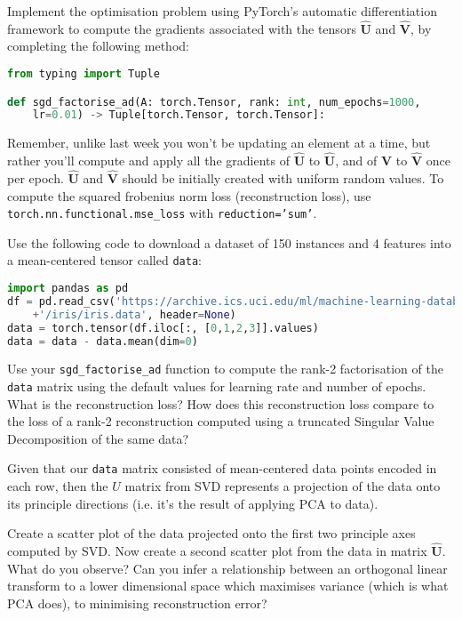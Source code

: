 \documentclass[a4paper]{article}
\begin{document}
\begin{tcolorbox}[title=1.1 Implement gradient-based factorisation using PyTorch's AD (1 mark)]
Implement the optimisation problem using PyTorch's automatic differentiation framework to compute the gradients associated with the tensors $\hat{\bm U}$ and $\hat{\bm V}$, by completing the following method:

\begin{lstlisting}[language=Python]
from typing import Tuple

def sgd_factorise_ad(A: torch.Tensor, rank: int, num_epochs=1000, 
	lr=0.01) -> Tuple[torch.Tensor, torch.Tensor]:
\end{lstlisting}

Remember, unlike last week you won't be updating an element at a time, but rather you'll compute and apply all the gradients of $\hat{\bm U}$ to $\hat{\bm U}$, and of $\hat{\bm V}$ to $\hat{\bm V}$ once per epoch. $\hat{\bm U}$ and $\hat{\bm V}$ should be initially created with uniform random values. To compute the squared frobenius norm loss (reconstruction loss), use \texttt{torch.nn.functional.mse\_loss} with \texttt{reduction='sum'}.
\end{tcolorbox}

\begin{tcolorbox}[title=1.2 Factorise and compute reconstruction error on real data (1 mark)]
Use the following code to download a dataset of 150 instances and 4 features into a mean-centered tensor called \texttt{data}:

\begin{lstlisting}[language=Python]
import pandas as pd
df = pd.read_csv('https://archive.ics.uci.edu/ml/machine-learning-databases'
	+'/iris/iris.data', header=None)
data = torch.tensor(df.iloc[:, [0,1,2,3]].values)
data = data - data.mean(dim=0)
\end{lstlisting}

Use your \texttt{sgd\_factorise\_ad} function to compute the rank-2 factorisation of the \texttt{data} matrix using the default values for learning rate and number of epochs. What is the reconstruction loss? How does this reconstruction loss compare to the loss of a rank-2 reconstruction computed using a truncated Singular Value Decomposition of the same data?
\end{tcolorbox}

\begin{tcolorbox}[title=1.3 Compare against PCA (1 mark)]
Given that our \texttt{data} matrix consisted of mean-centered data points encoded in each row, then the $U$ matrix from SVD represents a projection of the data onto its principle directions (i.e. it's the result of applying PCA to data).

Create a scatter plot of the data projected onto the first two principle axes computed by SVD. Now create a second scatter plot from the data in matrix $\hat{\bm U}$. What do you observe? Can you infer a relationship between an orthogonal linear transform to a lower dimensional space which maximises variance (which is what PCA does), to minimising reconstruction error?
\end{tcolorbox}
\end{document}
